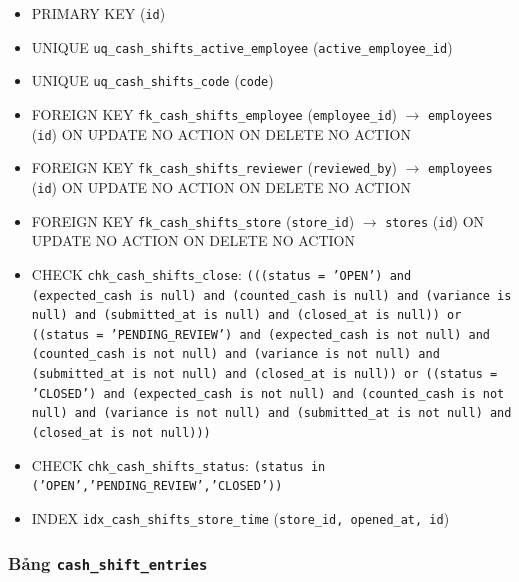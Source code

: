 \begin{itemize}

\item PRIMARY KEY (\texttt{id})

\item UNIQUE \texttt{uq\_cash\_shifts\_active\_employee} (\texttt{active\_employee\_id})

\item UNIQUE \texttt{uq\_cash\_shifts\_code} (\texttt{code})

\item FOREIGN KEY \texttt{fk\_cash\_shifts\_employee} (\texttt{employee\_id}) $\rightarrow$ \texttt{employees} (\texttt{id}) ON UPDATE NO ACTION ON DELETE NO ACTION

\item FOREIGN KEY \texttt{fk\_cash\_shifts\_reviewer} (\texttt{reviewed\_by}) $\rightarrow$ \texttt{employees} (\texttt{id}) ON UPDATE NO ACTION ON DELETE NO ACTION

\item FOREIGN KEY \texttt{fk\_cash\_shifts\_store} (\texttt{store\_id}) $\rightarrow$ \texttt{stores} (\texttt{id}) ON UPDATE NO ACTION ON DELETE NO ACTION

\item CHECK \texttt{chk\_cash\_shifts\_close}: \texttt{(((status = 'OPEN') and (expected\_cash is null) and (counted\_cash is null) and (variance is null) and (submitted\_at is null) and (closed\_at is null)) or ((status = 'PENDING\_REVIEW') and (expected\_cash is not null) and (counted\_cash is not null) and (variance is not null) and (submitted\_at is not null) and (closed\_at is null)) or ((status = 'CLOSED') and (expected\_cash is not null) and (counted\_cash is not null) and (variance is not null) and (submitted\_at is not null) and (closed\_at is not null)))}

\item CHECK \texttt{chk\_cash\_shifts\_status}: \texttt{(status in ('OPEN','PENDING\_REVIEW','CLOSED'))}

\item INDEX \texttt{idx\_cash\_shifts\_store\_time} (\texttt{store\_id, opened\_at, id})

\end{itemize}

\subsubsection{Bảng \texttt{cash\_shift\_entries}}

